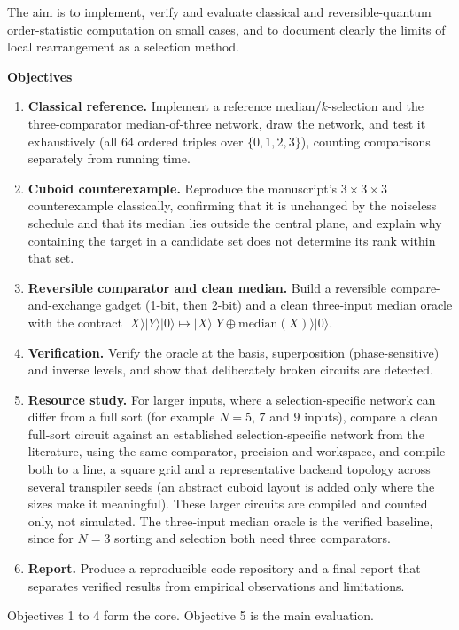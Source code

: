 \documentclass[11pt,a4paper]{article}
\begin{document}
The aim is to implement, verify and evaluate classical and reversible-quantum order-statistic computation on small cases, and to document clearly the limits of local rearrangement as a selection method.

\textbf{Objectives}
\begin{enumerate}
  \item \textbf{Classical reference.} Implement a reference median/$k$-selection and the three-comparator median-of-three network, draw the network, and test it exhaustively (all 64 ordered triples over $\{0,1,2,3\}$), counting comparisons separately from running time.
  \item \textbf{Cuboid counterexample.} Reproduce the manuscript's $3\times3\times3$ counterexample classically, confirming that it is unchanged by the noiseless schedule and that its median lies outside the central plane, and explain why containing the target in a candidate set does not determine its rank within that set.
  \item \textbf{Reversible comparator and clean median.} Build a reversible compare-and-exchange gadget (1-bit, then 2-bit) and a clean three-input median oracle with the contract $|X\rangle|Y\rangle|0\rangle \mapsto |X\rangle|Y\oplus \mathrm{median}(X)\rangle|0\rangle$.
  \item \textbf{Verification.} Verify the oracle at the basis, superposition (phase-sensitive) and inverse levels, and show that deliberately broken circuits are detected.
  \item \textbf{Resource study.} For larger inputs, where a selection-specific network can differ from a full sort (for example $N=5$, $7$ and $9$ inputs), compare a clean full-sort circuit against an established selection-specific network from the literature, using the same comparator, precision and workspace, and compile both to a line, a square grid and a representative backend topology across several transpiler seeds (an abstract cuboid layout is added only where the sizes make it meaningful). These larger circuits are compiled and counted only, not simulated. The three-input median oracle is the verified baseline, since for $N=3$ sorting and selection both need three comparators.
  \item \textbf{Report.} Produce a reproducible code repository and a final report that separates verified results from empirical observations and limitations.
\end{enumerate}
Objectives 1 to 4 form the core. Objective 5 is the main evaluation.
\end{document}
